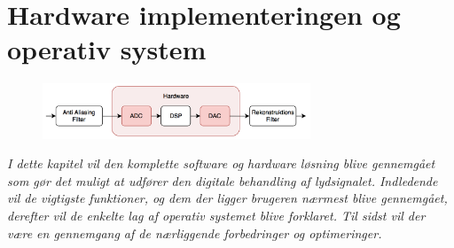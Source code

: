 \chapter{Hardware implementeringen og operativ system}\label{kap:hardware}

\begin{figure}[h]
	\vspace*{-1 cm}
	\includegraphics[width=8cm]{billeder/flow_hardware}
	\vspace{0.5 cm}
\end{figure}

\emph{I dette kapitel vil den komplette software og hardware løsning blive gennemgået som gør det muligt at udfører den digitale behandling af lydsignalet. Indledende vil de vigtigste funktioner, og dem der ligger brugeren nærmest blive gennemgået, derefter vil de enkelte lag af operativ systemet blive forklaret. Til sidst vil der være en gennemgang af de nærliggende forbedringer og optimeringer.}







